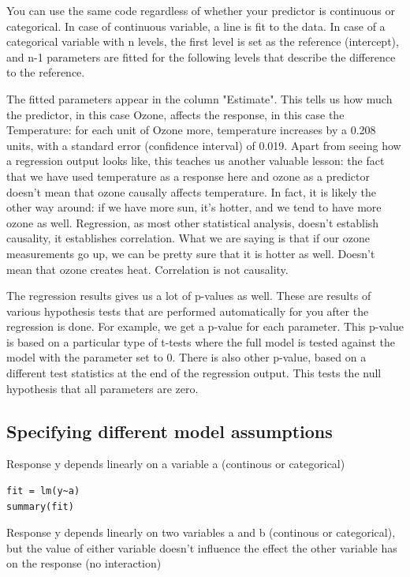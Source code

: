 \documentclass[a4paper,twoside]{tufte-book} %
\begin{document}
You can use the same code regardless of whether your predictor is continuous or categorical. In case of continuous variable, a line is fit to the data. In case of a categorical variable with n levels, the first level is set as the reference (intercept), and n-1 parameters are fitted for the following levels that describe the difference to the reference. 

The fitted parameters appear in the column "Estimate". This tells us how much the predictor, in this case Ozone, affects the response, in this case the Temperature: for each unit of Ozone more, temperature increases by a 0.208 units, with a standard error (confidence interval) of 0.019. Apart from seeing how a regression output looks like, this teaches us another valuable lesson: the fact that we have used temperature as a response here and ozone as a predictor doesn't mean that ozone causally affects temperature.  In fact, it is likely the other way around: if we have more sun, it's hotter, and we tend to have more ozone as well. Regression, as most other statistical analysis, doesn't establish causality, it establishes correlation. What we are saying is that if our ozone measurements go up, we can be pretty sure that it is hotter as well. Doesn't mean that ozone creates heat. Correlation is not causality. 

The regression results gives us a lot of p-values as well. These are results of various hypothesis tests that are performed automatically for you after the regression is done. For example, we get a p-value for each parameter. This p-value is based on a particular type of t-tests where the full model is tested against the model with the parameter set to 0. There is also other p-value, based on a different test statistics at the end of the regression output. This tests the null hypothesis that all parameters are zero.  

\subsection{Specifying different model assumptions}

Response y depends linearly on a variable a (continous or categorical)

\begin{lstlisting}
fit = lm(y~a)
summary(fit)
\end{lstlisting}

Response y depends linearly on two variables a and b (continous or categorical), but the value of either variable doesn't influence the effect the other variable has on the response (no interaction)
\end{document}
